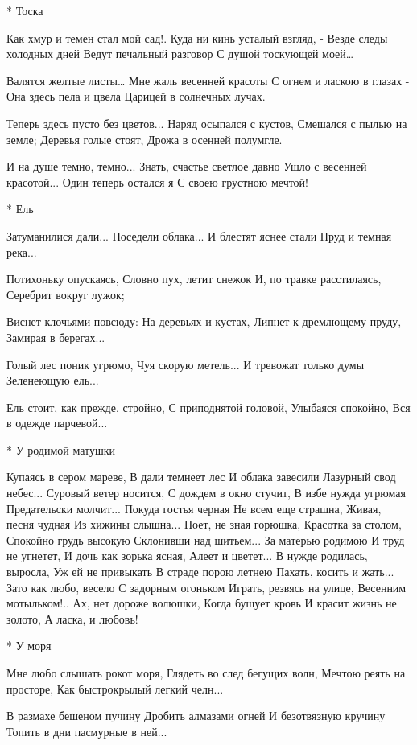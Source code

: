 * Тоска

Как хмур и темен стал мой сад!.
Куда ни кинь усталый взгляд, -
Везде следы холодных дней
Ведут печальный разговор
С душой тоскующей моей…

Валятся желтые листы…
Мне жаль весенней красоты
С огнем и ласкою в глазах -
Она здесь пела и цвела
Царицей в солнечных лучах.

Теперь здесь пусто без цветов...
Наряд осыпался с кустов,
Смешался с пылью на земле;
Деревья голые стоят,
Дрожа в осенней полумгле.

И на душе темно, темно...
Знать, счастье светлое давно
Ушло с весенней красотой...
Один теперь остался я
С своею грустною мечтой!


* Ель

Затуманилися дали...
Поседели облака...
И блестят яснее стали
Пруд и темная река...

Потихоньку опускаясь,
Словно пух, летит снежок
И, по травке расстилаясь,
Серебрит вокруг лужок;

Виснет клочьями повсюду:
На деревьях и кустах,
Липнет к дремлющему пруду,
Замирая в берегах...

Голый лес поник угрюмо,
Чуя скорую метель...
И тревожат только думы
Зеленеющую ель...

Ель стоит, как прежде, стройно,
С приподнятой головой,
Улыбаяся спокойно,
Вся в одежде парчевой...


* У родимой матушки

Купаясь в сером мареве,
В дали темнеет лес
И облака завесили
Лазурный свод небес...
Суровый ветер носится,
С дождем в окно стучит,
В избе нужда угрюмая
Предательски молчит...
Покуда гостья черная
Не всем еще страшна,
Живая, песня чудная
Из хижины слышна...
Поет, не зная горюшка,
Красотка за столом,
Спокойно грудь высокую
Склонивши над шитьем...
За матерью родимою
И труд не угнетет,
И дочь как зорька ясная,
Алеет и цветет...
В нужде родилась, выросла,
Уж ей не привыкать
В страде порою летнею
Пахать, косить и жать...
Зато как любо, весело
С задорным огоньком
Играть, резвясь на улице,
Весенним мотыльком!..
Ах, нет дороже волюшки,
Когда бушует кровь
И красит жизнь не золото,
А ласка, и любовь!


* У моря

Мне любо слышать рокот моря,
Глядеть во след бегущих волн,
Мечтою реять на просторе,
Как быстрокрылый легкий челн...

В размахе бешеном пучину
Дробить алмазами огней
И безотвязную кручину
Топить в дни пасмурные в ней...

